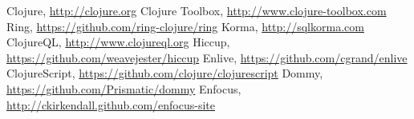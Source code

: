 \documentclass[10pt, a5paper]{article}
\begin{document}
\begin{thebibliography}{99}

 Clojure, \url{http://clojure.org}
 Clojure Toolbox, \url{http://www.clojure-toolbox.com}
 Ring, \url{https://github.com/ring-clojure/ring}
 Korma, \url{http://sqlkorma.com}
 ClojureQL, \url{http://www.clojureql.org}
 Hiccup, \url{https://github.com/weavejester/hiccup}
 Enlive, \url{https://github.com/cgrand/enlive}
 ClojureScript, \url{https://github.com/clojure/clojurescript}
 Dommy, \url{https://github.com/Prismatic/dommy}
 Enfocus, \url{http://ckirkendall.github.com/enfocus-site}
\end{thebibliography}
\end{document}
